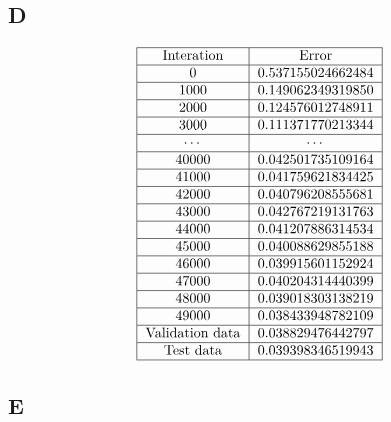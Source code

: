 \documentclass{article}
\begin{document}
        \subsection{D}
            \[
                \begin{tabular}{|c|c|}
                    \hline
                    \text{Interation} & \text{Error} \\
                    \hline
                    0 & 0.537155024662484 \\
                    \hline
                    1000 & 0.149062349319850 \\
                    \hline
                    2000 & 0.124576012748911 \\
                    \hline
                    3000 & 0.111371770213344 \\
                    \hline
                    $\cdots$ & $\cdots$\\
                    \hline
                    40000 & 0.042501735109164 \\
                    \hline
                    41000 & 0.041759621834425 \\
                    \hline
                    42000 & 0.040796208555681 \\
                    \hline
                    43000 & 0.042767219131763 \\
                    \hline
                    44000 & 0.041207886314534 \\
                    \hline
                    45000 & 0.040088629855188 \\
                    \hline
                    46000 & 0.039915601152924 \\
                    \hline
                    47000 & 0.040204314440399 \\
                    \hline
                    48000 & 0.039018303138219 \\
                    \hline
                    49000 & 0.038433948782109 \\
                    \hline
                    \text{Validation data} & 0.038829476442797\\
                    \hline
                    \text{Test data} & 0.039398346519943\\
                    \hline
                \end{tabular}
            \]
        \subsection{E}
\end{document}
